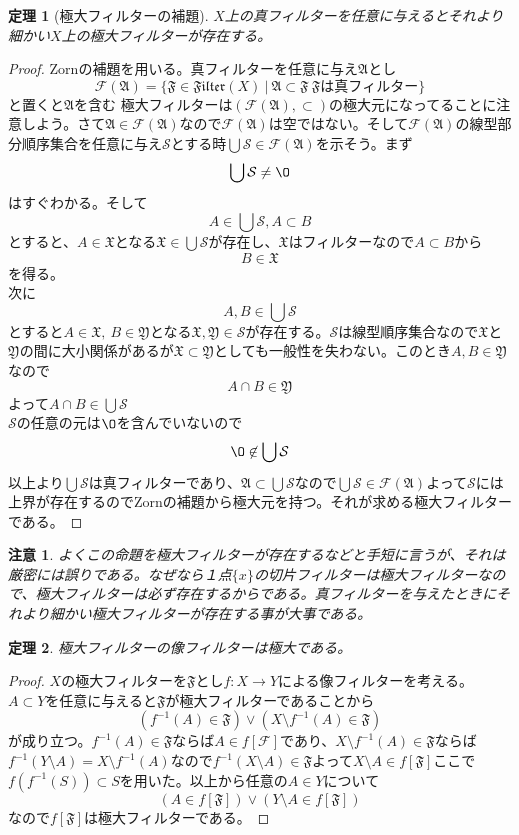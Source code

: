 \documentclass[leqno]{jsarticle}
\newtheorem{thm}{定理}
\newtheorem*{cau}{注意}
\newcommand{\ff}{\mathfrak{F}}
\newcommand{\fil}{\mathfrak{Filter}}
\newcommand{\aaa}{\mathfrak{A}}
\newcommand{\fff}{\mathcal{F}}
\newcommand{\s}{\mathcal{S}}
\begin{document}
\begin{thm}[極大フィルターの補題]$X$上の真フィルターを任意に与えるとそれより細かい$X$上の極大フィルターが存在する。

\end{thm}
\begin{proof}Zornの補題を用いる。真フィルターを任意に与え$\mathfrak{A}$とし
\[
\mathcal{F}(\mathfrak{A})=\{\mathfrak{F}\in \fil(X)\ |\ \mathfrak{A}\subset \mathfrak{F}\ \mathfrak{F}は真フィルター\}
\]
と置くと$\mathfrak{A}$を含む
極大フィルターは$(\mathcal{F}(\mathfrak{A}),\subset)$の極大元になってることに注意しよう。さて$\aaa\in \fff(\aaa)$なので$\fff(\aaa)$は空ではない。そして$\fff(\aaa)$の線型部分順序集合を任意に与え$\mathcal{S}$とする時$\bigcup\mathcal{S}\in \fff(\aaa)$を示そう。まず\[
\bigcup\s\neq\O
\]
はすぐわかる。そして
\[
A\in\bigcup\s,A\subset B
\]
とすると、$A\in \mathfrak{X}$となる$\mathfrak{X}\in \bigcup\s$が存在し、$\mathfrak{X}$はフィルターなので$A\subset B$から
\[
B\in \mathfrak{X}
\]
を得る。\\ 
次に
\[
A,B\in \bigcup\s
\]
とすると$A\in \mathfrak{X},\ B\in \mathfrak{Y}$となる$\mathfrak{X},\mathfrak{Y}\in \s$が存在する。$\s$は線型順序集合なので$\mathfrak{X}$と$\mathfrak{Y}$の間に大小関係があるが$\mathfrak{X}\subset\mathfrak{Y}$としても一般性を失わない。このとき$A,B\in \mathfrak{Y}$なので
\[
A\cap B\in \mathfrak{Y}
\]
よって$A\cap B\in \bigcup\s$\\ 
$\s$の任意の元は$\O$を含んでいないので
\[
\O\not\in \bigcup\s
\]以上より$\bigcup\s$は真フィルターであり、$\mathfrak{A}\subset\bigcup\s$なので$\bigcup\s\in\fff(\aaa)$よって$\s$には上界が存在するのでZornの補題から極大元を持つ。それが求める極大フィルターである。
\end{proof}
\begin{cau}
よくこの命題を極大フィルターが存在するなどと手短に言うが、それは厳密には誤りである。なぜなら１点$\{x\}$の切片フィルターは極大フィルターなので、極大フィルターは必ず存在するからである。真フィルターを与えたときにそれより細かい極大フィルターが存在する事が大事である。
\end{cau}

\begin{thm}\label{abc}
極大フィルターの像フィルターは極大である。
\end{thm}
\begin{proof}
$X$の極大フィルターを$\ff$とし$f:X\to Y$による像フィルターを考える。
$A\subset Y$を任意に与えると$\ff$が極大フィルターであることから
\[
(f^{-1}(A)\in \ff)\lor (X\setminus f^{-1}(A)\in \ff)
\]
が成り立つ。$f^{-1}(A)\in \ff$ならば$A\in f[\fff]$であり、$X\setminus f^{-1}(A)\in \ff$ならば
$f^{-1}(Y\setminus A)=X\setminus f^{-1}(A)$なので$f^{-1}(X\setminus A)\in \ff$よって$X\setminus A\in f[\ff]$ここで$f(f^{-1}(S))\subset S$を用いた。以上から任意の$A\in Y$について
\[
(A\in f[\ff])\lor(Y\setminus A\in f[\ff])
\]
なので$f[\ff]$は極大フィルターである。
\end{proof}
\end{document}
